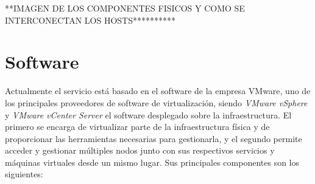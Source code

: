 **IMAGEN DE LOS COMPONENTES FISICOS Y COMO SE INTERCONECTAN LOS HOSTS**********

\section{Software}
Actualmente el servicio está basado en el software de la empresa VMware, uno de los principales proveedores de software de virtualización, siendo \emph{VMware vSphere} y \emph{VMware vCenter Server} el software desplegado sobre la infraestructura. El primero se encarga de virtualizar parte de la infraestructura física y de proporcionar las herramientas necesarias para gestionarla, y el segundo permite acceder y gestionar múltiples nodos junto con sus respectivos servicios y máquinas virtuales desde un mismo lugar. Sus principales componentes son los siguientes:
